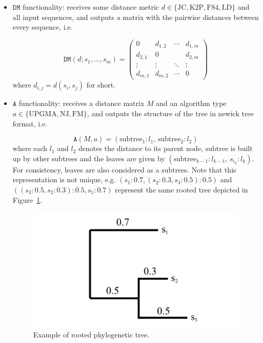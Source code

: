 \begin{itemize}
    \item $\mathtt{DM}$ functionality: receives some distance metric $d\in\{\text{JC}, \text{K2P}, \text{F84}, \text{LD}\}$ and all input sequences, and outputs a matrix with the pairwise distances between every sequence, i.e. 
    
    \begin{equation*}
        \mathtt{DM}(d; s_1, ..., s_m) = \begin{pmatrix}
                        0 & d_{1,2} & \cdots  & d_{1, m}\\
                        d_{2,1} & 0 &        &  d_{2, m} \\
                        \vdots &  \vdots  & \ddots &  \vdots \\
                        d_{m,1} & d_{m,2} &   \cdots   &  0
                        \end{pmatrix}
    \end{equation*}
    where $d_{i,j} = d(s_i, s_j)$ for short.
    
    \item $\mathtt{A}$ functionality: receives a distance matrix $M$ and an algorithm type $a \in \{\text{UPGMA}, \text{NJ}, \text{FM}\}$, and outputs the structure of the tree in newick tree format, i.e.
    
    $$\mathtt{A}(M, a) = (\text{subtree}_1:l_1,\, \text{subtree}_2:l_2)$$
    where each $l_1$ and $l_2$ denotes the distance to its parent node, $\text{subtree}$ is built up by other subtrees and the leaves are given by $(\text{subtree}_{k-1}:l_{k-1},\, s_{i_k}:l_k)$. For consistency, leaves are also considered as a subtrees. Note that this representation is not unique, e.g. $(s_1:0.7, (s_2:0.3, s_3:0.5):0.5)$ and $((s_3:0.5, s_2:0.3):0.5, s_1:0.7)$ represent the same rooted tree depicted in Figure~\ref{fig:tree}. 
    
    \begin{figure}[h]
        \centering
        \includegraphics[scale=0.4]{Chapter_PrivatePhylogeneticTrees/tree.png}
        \caption{Example of rooted phylogenetic tree.}
        \label{fig:tree}
    \end{figure}
    

\end{itemize}
